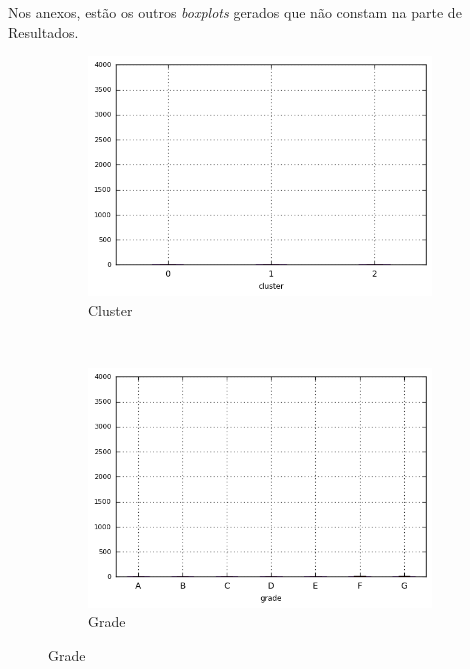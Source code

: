 \begin{anexosenv}
Nos anexos, estão os outros \emph{boxplots} gerados que não constam na parte de Resultados.

\clearpage

\begin{figure}[t!]
    \centering
        \caption{\emph{Boxplots} de collection\textunderscore recovery\textunderscore fee }
        \begin{subfigure}[t]{0.45\textwidth}
            \centering
            \caption{Cluster }

            \centerline{\includegraphics[width=1\textwidth]{img/collection_recovery_fee_by_cluster}}
        \end{subfigure}%
        ~ 
        \begin{subfigure}[t]{0.45\textwidth}
            \centering
            \caption{Grade}
   
            \centerline{\includegraphics[width=1\textwidth]{img/collection_recovery_fee_by_grade}}


\end{subfigure}
\end{figure}
\end{anexosenv}
